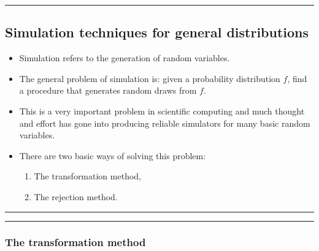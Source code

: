 \documentclass[]{article}
\begin{document}
\begin{center}\rule{0.5\linewidth}{\linethickness}\end{center}

\subsection{Simulation techniques for general
distributions}\label{simulation-techniques-for-general-distributions}

\begin{itemize}
\item
  Simulation refers to the generation of random variables.
\item
  The general problem of simulation is: given a probability distribution
  \(f\), find a procedure that generates random draws from \(f\).
\item
  This is a very important problem in scientific computing and much
  thought and effort has gone into producing reliable simulators for
  many basic random variables.
\item
  There are two basic ways of solving this problem:

  \begin{enumerate}
  \def\labelenumi{\arabic{enumi}.}
  \item
    The transformation method,
  \item
    The rejection method.
  \end{enumerate}
\end{itemize}

\begin{center}\rule{0.5\linewidth}{\linethickness}\end{center}

\begin{center}\rule{0.5\linewidth}{\linethickness}\end{center}

\subsubsection{The transformation
method}\label{the-transformation-method}
\end{document}
